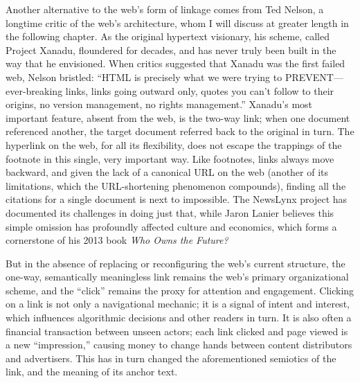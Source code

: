 Another alternative to the web's form of linkage comes from Ted Nelson, a longtime critic of the web's architecture, whom I will discuss at greater length in the following chapter. As the original hypertext visionary, his scheme, called Project Xanadu, floundered for decades, and has never truly been built in the way that he envisioned. When critics suggested that Xanadu was the first failed web, Nelson bristled: ``HTML is precisely what we were trying to PREVENT---ever-breaking links, links going outward only, quotes you can't follow to their origins, no version management, no rights management.''\autocite{nelson_ted_1999} Xanadu's most important feature, absent from the web, is the two-way link; when one document referenced another, the target document referred back to the original in turn. The hyperlink on the web, for all its flexibility, does not escape the trappings of the footnote in this single, very important way. Like footnotes, links always move backward, and given the lack of a canonical URL on the web (another of its limitations, which the URL-shortening phenomenon compounds), finding all the citations for a single document is next to impossible. The NewsLynx project has documented its challenges in doing just that, while Jaron Lanier believes this simple omission has profoundly affected culture and economics, which forms a cornerstone of his 2013 book \emph{Who Owns the Future?}\autocite{abelson_hyper-compensation:_2014,lanier_who_2013}

But in the absence of replacing or reconfiguring the web's current structure, the one-way, semantically meaningless link remains the web's primary organizational scheme, and the ``click'' remains the proxy for attention and engagement. Clicking on a link is not only a navigational mechanic; it is a signal of intent and interest, which influences algorithmic decisions and other readers in turn. It is also often a financial transaction between unseen actors; each link clicked and page viewed is a new ``impression,'' causing money to change hands between content distributors and advertisers. This has in turn changed the aforementioned semiotics of the link, and the meaning of its anchor text.

